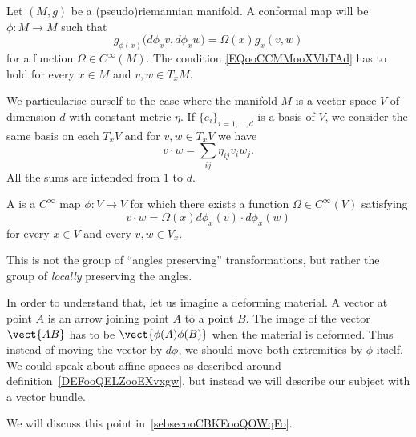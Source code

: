 \begin{definition}
Let \( (M,g)\) be a (pseudo)riemannian manifold. A conformal map will be \( \phi\colon M\to M\) such that
\begin{equation}        \label{EQooCCMMooXVbTAd}
    g_{\phi(x)}\big( d\phi_xv,d\phi_xw \big)=\Omega(x)g_x(v,w)
\end{equation}
for a function \( \Omega\in C^{\infty}(M)\). The condition \eqref{EQooCCMMooXVbTAd} has to hold for every \( x\in M\) and \( v,w\in T_xM\).
\end{definition}

We particularise ourself to the case where the manifold \( M\) is a vector space \( V\) of dimension \( d\) with constant metric \( \eta\). If \( \{ e_i \}_{i=1,\ldots, d}\) is a basis of \( V\), we consider the same basis on each \( T_xV\) and for \( v,w\in T_xV\) we have
\begin{equation}
    v\cdot w=\sum_{ij}\eta_{ij}v_iw_j.
\end{equation}
All the sums are intended from \( 1\) to \( d\).

\begin{definition}      \label{DEFooVKNBooFBWQQM}
    A  is a \(  C^{\infty}\) map \( \phi\colon V\to V\) for which there exists a function \( \Omega\in C^{\infty}(V)\) satisfying
    \begin{equation}        \label{EQooOZDUooCDaIrh}
        v\cdot w=\Omega(x) d\phi_x(v)\cdot d\phi_x(w)
    \end{equation}
    for every \( x\in V\) and every \( v,w\in V_x\).
\end{definition}


\begin{normaltext}  \label{NorooVEVOooRBpvXF}
    This is not the group of ``angles preserving'' transformations, but rather the group of \emph{locally} preserving the angles.

In order to understand that, let us imagine a deforming material. A vector at point \( A\) is an arrow joining point \( A\) to a point \( B\). The image of the vector \( \vect{ AB }\) has to be \( \vect{ \phi(A)\phi(B) }\) when the material is deformed. Thus instead of moving the vector by \( d\phi\), we should move both extremities by \( \phi\) itself. We could speak about affine spaces as described around definition~\ref{DEFooQELZooEXvxgw}, but instead we will describe our subject with a vector bundle.

We will discuss this point in~\ref{sebsecooCBKEooQOWqFo}.
\end{normaltext}

